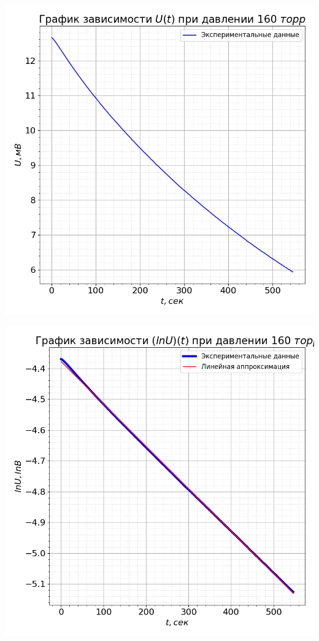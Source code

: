 \documentclass[a4paper, 12pt]{article}
\begin{document}
        \begin{minipage}{0.47\textwidth}
            \includegraphics[width=1\linewidth]{graphs/raw160.png}
        \end{minipage}
        \begin{minipage}{0.47\textwidth}
            \includegraphics[width=1\linewidth]{graphs/log160.png}
        \end{minipage}
\end{document}
